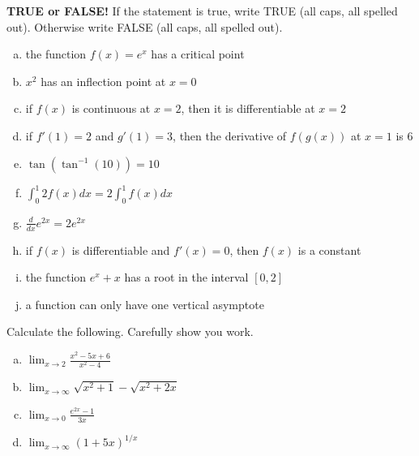 \documentclass[11pt]{exam}
\theoremstyle{definition}
\begin{document}
\begin{questions}

\addpoints

\question[20]\mbox{}
\textbf{TRUE or FALSE!}
If the statement is true, write TRUE (all caps, all spelled out).
Otherwise write FALSE (all caps, all spelled out).
\begin{enumerate}[(a)]
\item the function $f(x) = e^x$ has a critical point
\vspace{0.6in}
\item $x^2$ has an inflection point at $x=0$
\vspace{0.6in}
\item if $f(x)$ is continuous at $x=2$, then it is differentiable at $x=2$
\vspace{0.6in}
\item if $f'(1) = 2$ and $g'(1) = 3$, then the derivative of $f(g(x))$ at $x=1$ is $6$
\vspace{0.6in}
\item $\tan(\tan^{-1}(10)) = 10$
\vspace{0.6in}
\item $\int_0^1 2f(x)dx = 2\int_0^1 f(x) dx$
\vspace{0.6in}
\item $\frac{d}{dx}e^{2x} = 2e^{2x}$
\vspace{0.6in}
\item if $f(x)$ is differentiable and $f'(x) = 0$, then $f(x)$ is a constant
\vspace{0.6in}
\item the function $e^x+x$ has a root in the interval $[0,2]$
\vspace{0.6in}
\item a function can only have one vertical asymptote
\end{enumerate}

\newpage
\question[10]\mbox{}
Calculate the following.  Carefully show you work.
\begin{enumerate}[(a)]
\item $\lim_{x\rightarrow 2}\frac{x^2-5x+6}{x^2-4}$
\vspace{2in}
\item $\lim_{x\rightarrow \infty}\sqrt{x^2+1}-\sqrt{x^2+2x}$
\vspace{2in}
\item $\lim_{x\rightarrow 0} \frac{e^{2x}-1}{3x}$
\vspace{2in}
\item $\lim_{x\rightarrow \infty} (1+5x)^{1/x}$
\vspace{2in}
\end{enumerate}


\end{questions}
\end{document}
